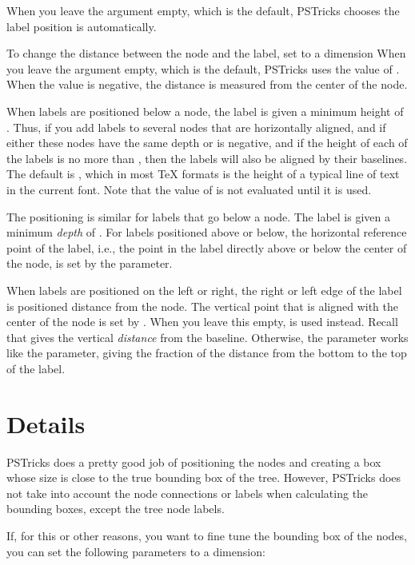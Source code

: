 \documentclass[11pt,english,BCOR10mm,DIV12,bibliography=totoc,parskip=false,smallheadings
    headexclude,footexclude,oneside]{pst-doc}
\begin{document}
When you leave the argument empty, which is the default, PSTricks chooses the
label position is automatically.

To change the distance between the node and the label, set  to a dimension
When you leave the argument empty, which is the default, PSTricks uses the
value of . When the value is negative, the distance is measured
from the center of the node.

When labels are positioned below a node, the label is given a minimum height
of .
Thus, if you add labels to several nodes that are horizontally aligned, and if
either these nodes have the same depth or  is negative, and if the
height of each of the labels is no more than , then the labels
will also be aligned by their baselines. The default is , which
in most \TeX{} formats is the height of a typical line of text in the current
font. Note that the value of  is not evaluated until it is used.

The positioning is similar for labels that go below a node. The label is given
a minimum \emph{depth} of .
For labels positioned above or below, the horizontal reference point of the
label, i.e., the point in the label directly above or below the center of the
node, is set by the  parameter.

When labels are positioned on the left or right, the right or left edge of the
label is positioned distance  from the node. The vertical point that
is aligned with the center of the node is set by .
When you leave this empty,  is used instead. Recall that 
gives the vertical \emph{distance} from the baseline. Otherwise, the
 parameter works like the  parameter, giving the fraction of
the distance from the bottom to the top of the label.

\section{Details}

PSTricks does a pretty good job of positioning the nodes and creating a box
whose size is close to the true bounding box of the tree. However, PSTricks
does not take into account the node connections or labels when calculating the
bounding boxes, except the tree node labels.

If, for this or other reasons, you want to fine tune the bounding box of the
nodes, you can set the following parameters to a dimension:
\end{document}
